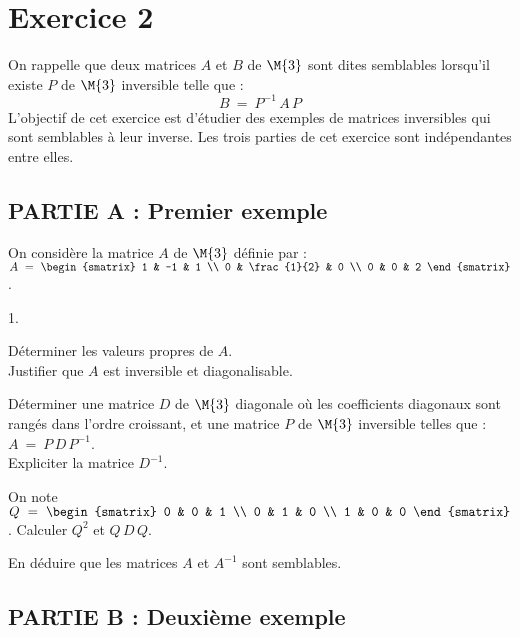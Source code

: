 \documentclass[11pt]{article}%
\begin{document}
\newpage %


\section*{Exercice 2}

\noindent
On rappelle que deux matrices $A$ et $B$ de $\M{3}$ sont dites
semblables lorsqu'il existe $P$ de $\M{3}$ inversible telle que : 
\[
B \ = \ P^{-1} \, A \, P
\]
L'objectif de cet exercice est d'étudier des exemples de matrices
inversibles qui sont semblables à leur inverse. Les trois parties de
cet exercice sont indépendantes entre elles.

\subsection*{PARTIE A : Premier exemple}

\noindent
On considère la matrice $A$ de $\M{3}$ définie par : $A \ = \ 
\begin{smatrix}
  1 & -1 & 1 \\
  0 & \frac{1}{2} & 0 \\
  0 & 0 & 2
\end{smatrix}
$.

\begin{noliste}{1.}
  \setlength{\itemsep}{4mm} %
\item Déterminer les valeurs propres de $A$.\\
  Justifier que $A$ est inversible et diagonalisable.

\item Déterminer une matrice $D$ de $\M{3}$ diagonale où les
  coefficients diagonaux sont rangés dans l'ordre croissant, et une
  matrice $P$ de $\M{3}$ inversible telles que : $A \ = \ P \, D \,
  P^{-1}$.\\
  Expliciter la matrice $D^{-1}$.

\item On note $Q \ = \
  \begin{smatrix}
    0 & 0 & 1 \\
    0 & 1 & 0 \\
    1 & 0 & 0
  \end{smatrix}
  $. Calculer $Q^2$ et $Q \, D \, Q$.

\item En déduire que les matrices $A$ et $A^{-1}$ sont semblables.
  
\end{noliste}

\subsection*{PARTIE B : Deuxième exemple}
\end{document}
